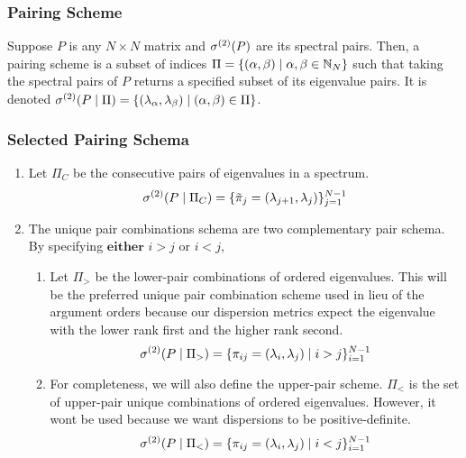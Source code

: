 \begin{frame} \frametitle{Pairing Scheme}

\begin{alertblock}{}
Suppose $P$ is any $N \times N$ matrix and ${\sigma^{(2)}}(P)$ are its spectral pairs. Then, a pairing scheme is a subset of indices $\Pi = \{(\alpha,\beta) \mid \alpha, \beta \in \mathbb{N}_N\}$ such that taking the spectral pairs of $P$ returns
a specified subset of its eigenvalue pairs. It is denoted ${\sigma^{(2)}}(P \mid \Pi) = \{(\lambda_{\alpha},\lambda_{\beta}) \mid ({\alpha},{\beta}) \in \Pi\}$.
\end{alertblock}

\end{frame}
\begin{frame} \frametitle{Selected Pairing Schema}


\begin{enumerate}
  \item Let $\Pi_C$ be the consecutive pairs of eigenvalues in a spectrum.
    $${\sigma^{(2)}}(P \mid \Pi_C) = \{{\tilde{\pi}}_{j} = (\lambda_{j + 1},\lambda_j)\}_{j = 1}^{N-1}$$
  \item The unique pair combinations schema are two complementary pair schema. By specifying $\textbf{either}$ $i > j$ or $i < j$,
  \begin{enumerate}
    \item Let $\Pi_>$ be the lower-pair combinations of ordered eigenvalues.
      This will be the preferred unique pair combination scheme used in lieu of the argument orders because our dispersion metrics expect the eigenvalue with the lower rank first and the higher rank second.
    $${\sigma^{(2)}}(P \mid \Pi_>) = \{\pi_{ij} = (\lambda_i,\lambda_j) \mid i > j\}_{i = 1}^{N-1}$$
    \item For completeness, we will also define the upper-pair scheme. $\Pi_<$ is the set of upper-pair unique combinations of ordered eigenvalues.
      However, it wont be used because we want dispersions to be positive-definite.
    $${\sigma^{(2)}}(P \mid \Pi_<) = \{\pi_{ij} = (\lambda_i,\lambda_j) \mid i < j\}_{i = 1}^{N-1}$$
    \end{enumerate}
\end{enumerate}

\end{frame}

